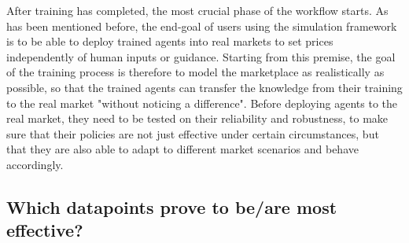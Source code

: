 After training has completed, the most crucial phase of the workflow starts. As has been mentioned before, the end-goal of users using the simulation framework is to be able to deploy trained agents into real markets to set prices independently of human inputs or guidance. Starting from this premise, the goal of the training process is therefore to model the marketplace as realistically as possible, so that the trained agents can transfer the knowledge from their training to the real market "without noticing a difference". Before deploying agents to the real market, they need to be tested on their reliability and robustness, to make sure that their policies are not just effective under certain circumstances, but that they are also able to adapt to different market scenarios and behave accordingly.

\subsection{Which datapoints prove to be/are most effective?}